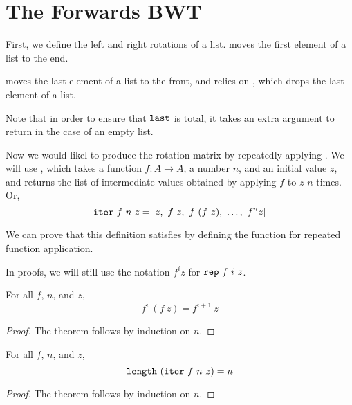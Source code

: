 \documentclass[11pt]{thesis}
\begin{document}
\section{The Forwards BWT}
\label{sec:forwards_BWT}

First, we define the left and right rotations of a list. 
moves the first element of a list to the end.

 moves the last element of a list to the front, and
relies on , which drops the last element of a list.


Note that in order to ensure that $\texttt{last}$ is total, it takes
an extra argument to return in the case of an empty list.

Now we would likel to produce the rotation matrix by repeatedly
applying . We will use , which takes a function
$f : A \to A$, a number $n$, and an initial value $z$, and returns the
list of intermediate values obtained by applying $f$ to $z$ $n$ times.
Or,
\begin{equation}
  \texttt{iter}~f~n~z = [z,~f~z,~f~(f~z),~\ldots,~f^n z]
  \label{eq:iter}
\end{equation}


We can prove that this definition satisfies  by defining
the function  for repeated function application.

In proofs, we will still use the notation $f^i z$ for $\texttt{rep}~f~i~z$.

\begin{theorem}[rep\_r]
  For all $f$, $n$, and $z$,
  \begin{equation}
     f^i~(f~z) = f^{i+1}~z
  \end{equation}
\end{theorem}
\begin{proof}
  The theorem follows by induction on $n$.
\end{proof}

\begin{theorem}
  For all $f$, $n$, and $z$,
  \begin{equation}
    \texttt{length}~(\texttt{iter}~f~n~z) = n
  \end{equation}
\end{theorem}
\begin{proof}
  The theorem follows by induction on $n$.
\end{proof}
\end{document}
